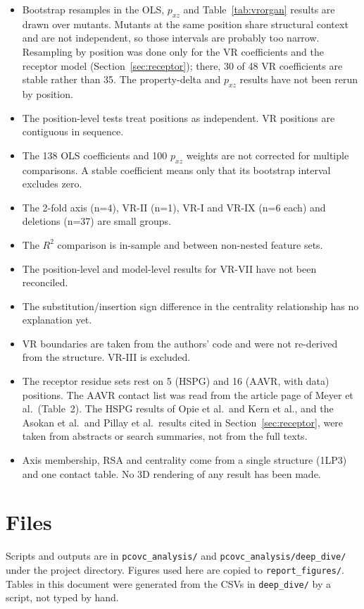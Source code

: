 \documentclass[11pt]{article}
\begin{document}
\begin{itemize}
\item Bootstrap resamples in the OLS, $p_{xz}$ and Table~\ref{tab:vrorgan} results are drawn over
  mutants. Mutants at the same position share structural context and are not independent, so
  those intervals are probably too narrow. Resampling by position was done only for the VR
  coefficients and the receptor model (Section~\ref{sec:receptor}); there, 30 of 48 VR
  coefficients are stable rather than 35. The property-delta and $p_{xz}$ results have not been rerun
  by position.
\item The position-level tests treat positions as independent. VR positions are contiguous in
  sequence.
\item The 138 OLS coefficients and 100 $p_{xz}$ weights are not corrected for multiple
  comparisons. A stable coefficient means only that its bootstrap interval excludes zero.
\item The 2-fold axis (n=4), VR-II (n=1), VR-I and VR-IX (n=6 each) and deletions (n=37) are
  small groups.
\item The $R^2$ comparison is in-sample and between non-nested feature sets.
\item The position-level and model-level results for VR-VII have not been reconciled.
\item The substitution/insertion sign difference in the centrality relationship has no
  explanation yet.
\item VR boundaries are taken from the authors' code and were not re-derived from the structure.
  VR-III is excluded.
\item The receptor residue sets rest on 5 (HSPG) and 16 (AAVR, with data) positions. The AAVR
  contact list was read from the article page of Meyer et al.\ (Table~2). The HSPG results of Opie
  et al.\ and Kern et al., and the Asokan et al.\ and Pillay et al.\ results cited in
  Section~\ref{sec:receptor}, were taken from abstracts or search summaries, not from the full
  texts.
\item Axis membership, RSA and centrality come from a single structure (1LP3) and one contact
  table. No 3D rendering of any result has been made.
\end{itemize}

\section{Files}

Scripts and outputs are in \texttt{pcovc\_analysis/} and \texttt{pcovc\_analysis/deep\_dive/}
under the project directory. Figures used here are copied to \texttt{report\_figures/}.
Tables in this document were generated from the CSVs in \texttt{deep\_dive/} by a script, not
typed by hand.
\end{document}
